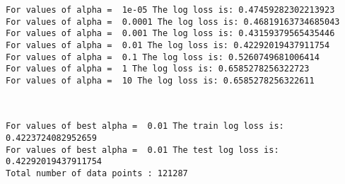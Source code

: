 \documentclass[11pt]{article}
\begin{document}
    \begin{Verbatim}[commandchars=\\\{\}]
For values of alpha =  1e-05 The log loss is: 0.47459282302213923
For values of alpha =  0.0001 The log loss is: 0.46819163734685043
For values of alpha =  0.001 The log loss is: 0.43159379565435446
For values of alpha =  0.01 The log loss is: 0.42292019437911754
For values of alpha =  0.1 The log loss is: 0.5260749681006414
For values of alpha =  1 The log loss is: 0.6585278256322723
For values of alpha =  10 The log loss is: 0.6585278256322611

    \end{Verbatim}

    \begin{center}
    \end{center}
    { \hspace*{\fill} \\}
    
    \begin{Verbatim}[commandchars=\\\{\}]
For values of best alpha =  0.01 The train log loss is: 0.4223724082952659
For values of best alpha =  0.01 The test log loss is: 0.42292019437911754
Total number of data points : 121287

    \end{Verbatim}

    \begin{center}
    \end{center}
    { \hspace*{\fill} \\}
    
\end{document}
